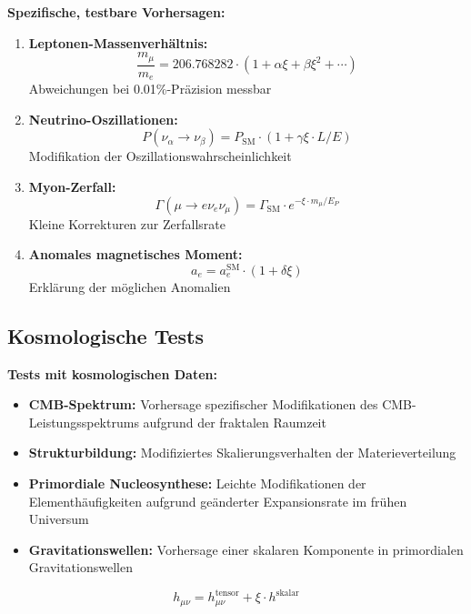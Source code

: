 \documentclass[12pt,a4paper]{article}
\newcommand{\xipar}{\xi}
\begin{document}
	\begin{anwendung}
		\textbf{Spezifische, testbare Vorhersagen:}
		
		\begin{enumerate}
			\item \textbf{Leptonen-Massenverhältnis:}
			\begin{equation}
				\frac{m_\mu}{m_e} = 206.768282 \cdot (1 + \alpha \xipar + \beta \xipar^2 + \cdots)
			\end{equation}
			Abweichungen bei 0.01\%-Präzision messbar
			
			\item \textbf{Neutrino-Oszillationen:}
			\begin{equation}
				P(\nu_\alpha \to \nu_\beta) = P_{\text{SM}} \cdot (1 + \gamma \xipar \cdot L/E)
			\end{equation}
			Modifikation der Oszillationswahrscheinlichkeit
			
			\item \textbf{Myon-Zerfall:}
			\begin{equation}
				\Gamma(\mu \to e\nu_e\nu_\mu) = \Gamma_{\text{SM}} \cdot e^{-\xipar \cdot m_\mu/E_P}
			\end{equation}
			Kleine Korrekturen zur Zerfallsrate
			
			\item \textbf{Anomales magnetisches Moment:}
			\begin{equation}
				a_e = a_e^{\text{SM}} \cdot (1 + \delta \xipar)
			\end{equation}
			Erklärung der möglichen Anomalien
		\end{enumerate}
	\end{anwendung}
	
	\subsection{Kosmologische Tests}
	
	\begin{anwendung}
		\textbf{Tests mit kosmologischen Daten:}
		
		\begin{itemize}
			\item \textbf{CMB-Spektrum:} Vorhersage spezifischer Modifikationen des CMB-Leistungsspektrums aufgrund der fraktalen Raumzeit
			
			\item \textbf{Strukturbildung:} Modifiziertes Skalierungsverhalten der Materieverteilung
			
			\item \textbf{Primordiale Nucleosynthese:} Leichte Modifikationen der Elementhäufigkeiten aufgrund geänderter Expansionsrate im frühen Universum
			
			\item \textbf{Gravitationswellen:} Vorhersage einer skalaren Komponente in primordialen Gravitationswellen
		\end{itemize}
		
		\begin{equation}
			h_{\mu\nu} = h_{\mu\nu}^{\text{tensor}} + \xipar \cdot h^{\text{skalar}}
		\end{equation}
	\end{anwendung}
	
\end{document}
